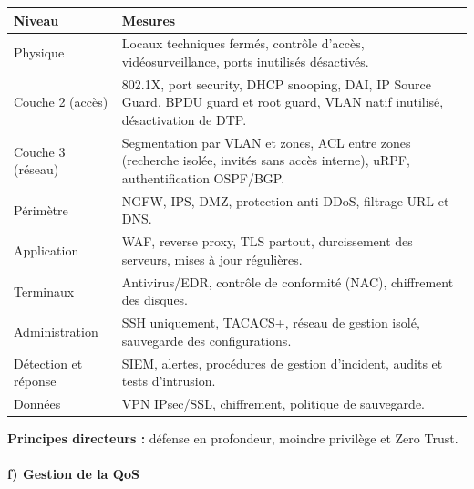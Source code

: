 \documentclass[12pt,a4paper]{article}
\begin{document}
\begin{longtable}{|L{3.4cm}|L{11.2cm}|}
\hline
\textbf{Niveau} & \textbf{Mesures} \\ \hline
\endhead
Physique & Locaux techniques fermés, contrôle d'accès,
vidéosurveillance, ports inutilisés désactivés. \\ \hline
Couche 2 (accès) & 802.1X, port security, DHCP snooping, DAI, IP Source
Guard, BPDU guard et root guard, VLAN natif inutilisé, désactivation de
DTP. \\ \hline
Couche 3 (réseau) & Segmentation par VLAN et zones, ACL entre zones
(recherche isolée, invités sans accès interne), uRPF, authentification
OSPF/BGP. \\ \hline
Périmètre & NGFW, IPS, DMZ, protection anti-DDoS, filtrage URL et DNS.
\\ \hline
Application & WAF, reverse proxy, TLS partout, durcissement des
serveurs, mises à jour régulières. \\ \hline
Terminaux & Antivirus/EDR, contrôle de conformité (NAC), chiffrement
des disques. \\ \hline
Administration & SSH uniquement, TACACS+, réseau de gestion isolé,
sauvegarde des configurations. \\ \hline
Détection et réponse & SIEM, alertes, procédures de gestion d'incident,
audits et tests d'intrusion. \\ \hline
Données & VPN IPsec/SSL, chiffrement, politique de sauvegarde. \\ \hline
\end{longtable}

\textbf{Principes directeurs :} défense en profondeur, moindre
privilège et Zero Trust.

\paragraph{f) Gestion de la QoS}
\end{document}
